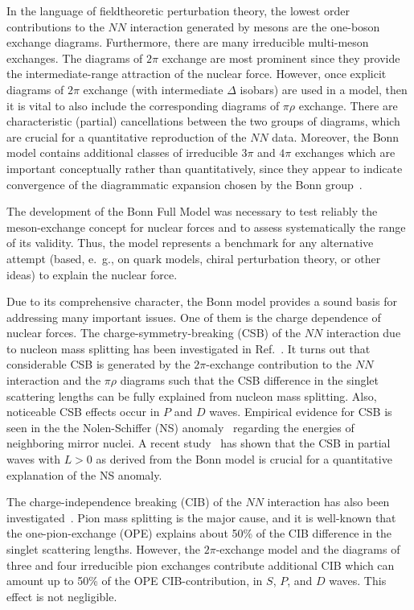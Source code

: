 In the language of fieldtheoretic perturbation theory, the lowest order
contributions to the $NN$ interaction generated by mesons
are the one-boson exchange diagrams.
Furthermore, there are many irreducible multi-meson exchanges. 
The diagrams of $2\pi$ exchange are most prominent since they 
provide the intermediate-range attraction of the nuclear force.
However, once explicit diagrams of $2\pi$ exchange (with intermediate
$\Delta$ isobars) are used in
a model, then it is vital to also include  the corresponding
diagrams of $\pi\rho$ exchange. There are characteristic (partial)
cancellations between the two groups of diagrams, which
are crucial for a quantitative reproduction of the $NN$ data.
Moreover, the Bonn model contains additional classes of
irreducible $3\pi$ and $4\pi$ exchanges which are
important conceptually rather than quantitatively, since they
appear to indicate convergence of the diagrammatic
expansion chosen by the Bonn group~\cite{MHE87}.

The development of the Bonn Full Model was necessary 
to test reliably the meson-exchange concept for nuclear forces
and to assess systematically the range of its validity.
Thus, the model represents a benchmark for any alternative attempt
(based, e.~g., on quark models, chiral perturbation theory, or other ideas)
to explain the nuclear force.

Due to its comprehensive character, the Bonn model provides a sound basis for 
addressing many important issues.
One of them is the charge dependence of nuclear forces.
The charge-symmetry-breaking (CSB) of the $NN$ interaction 
due to nucleon mass splitting
has been investigated in Ref.~\cite{LM98a}.
It turns out that considerable CSB is generated by
the $2\pi$-exchange contribution to the $NN$ interaction and the
$\pi\rho$ diagrams such that
the CSB difference in the singlet scattering lengths 
can be fully explained from nucleon mass splitting.
Also, noticeable CSB effects occur in $P$ and $D$ waves.
Empirical evidence for CSB is seen in the
the Nolen-Schiffer (NS) anomaly~\cite{NS69}
regarding the energies of neighboring mirror nuclei. 
A recent study~\cite{MPM99} has shown that
the CSB in partial waves with $L>0$
as derived from the Bonn model
is crucial for a quantitative explanation of the NS anomaly.

The charge-independence breaking (CIB) of the $NN$ interaction 
has also been investigated~\cite{LM98b}.
Pion mass splitting is the major cause, and it is well-known
that the one-pion-exchange (OPE) explains about 50\% of the CIB difference
in the singlet scattering lengths. 
However, 
the $2\pi$-exchange model and
the diagrams of three and four irreducible pion exchanges
contribute additional CIB which can amount
up to 50\% of the OPE CIB-contribution, in $S$, $P$, and $D$ waves.
This effect is not negligible.

